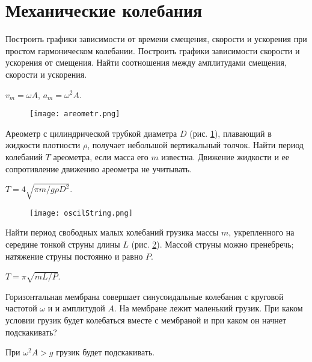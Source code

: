 \section{Механические колебания}

\begin{ex} %
Построить графики зависимости от времени смещения, скорости и ускорения при простом гармоническом колебании. Построить графики зависимости скорости и ускорения от смещения. Найти соотношения между амплитудами смещения, скорости и ускорения.
\begin{ans}
$v_m = \omega A$, $a_m = \omega^2 A$.
\end{ans}
\end{ex}	

\begin{figure}[h]
\centering
\texttt{[image: areometr.png]}
\caption{}
\label{areometr}
\end{figure}

\begin{ex} %
Ареометр с цилиндрической трубкой диаметра $D$ (рис. \ref{areometr}), плавающий в жидкости плотности $\rho$, получает небольшой вертикальный толчок. Найти период колебаний $T$ ареометра, если масса его $m$ известна. Движение жидкости и ее сопротивление движению ареометра не учитывать.
\begin{ans}
$T = 4 \sqrt{\pi m / g \rho D^2}$.
\end{ans}
\end{ex}	

\begin{figure}[h]
\centering
\texttt{[image: oscilString.png]}
\caption{}
\label{oscilString}
\end{figure}

\begin{ex} %
Найти период свободных малых колебаний грузика массы $m$, укрепленного на середине тонкой струны длины $L$ (рис. \ref{oscilString}). Массой струны можно пренебречь; натяжение струны постоянно и равно $P$.
\begin{ans}
$T = \pi \sqrt{m L /P}$.
\end{ans}
\end{ex}	

\begin{ex} %
Горизонтальная мембрана совершает синусоидальные колебания с круговой частотой $\omega$ и и амплитудой $A$. На мембране лежит маленький грузик. При каком условии грузик будет колебаться вместе с мембраной и при каком он начнет подскакивать?
\begin{ans}
При $\omega^2 A > g$ грузик будет подскакивать.
\end{ans}
\end{ex}	

